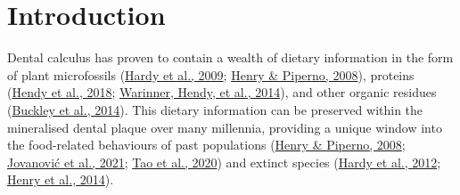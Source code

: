 \documentclass[
  letterpaper,
]{book}
\begin{document}

\hypertarget{byocstarch-intro}{%
\chapter{Introduction}\label{byocstarch-intro}}

Dental calculus has proven to contain a wealth of dietary information in
the form of plant microfossils
(\protect\hyperlink{ref-hardyStarchGranules2009}{Hardy et al., 2009};
\protect\hyperlink{ref-henryCalculusSyria2008}{Henry \& Piperno, 2008}),
proteins (\protect\hyperlink{ref-hendyProteomicCalculus2018}{Hendy et
al., 2018}; \protect\hyperlink{ref-warinnerEvidenceMilk2014}{Warinner,
Hendy, et al., 2014}), and other organic residues
(\protect\hyperlink{ref-buckleyDentalCalculus2014}{Buckley et al.,
2014}). This dietary information can be preserved within the mineralised
dental plaque over many millennia, providing a unique window into the
food-related behaviours of past populations
(\protect\hyperlink{ref-henryCalculusSyria2008}{Henry \& Piperno, 2008};
\protect\hyperlink{ref-jovanovicNeolithicCalculus2021}{Jovanović et al.,
2021}; \protect\hyperlink{ref-taoWheatCalculus2020}{Tao et al., 2020})
and extinct species
(\protect\hyperlink{ref-hardyNeanderthalMedics2012}{Hardy et al., 2012};
\protect\hyperlink{ref-henryNeanderthalCalculus2014}{Henry et al.,
2014}).
\end{document}
